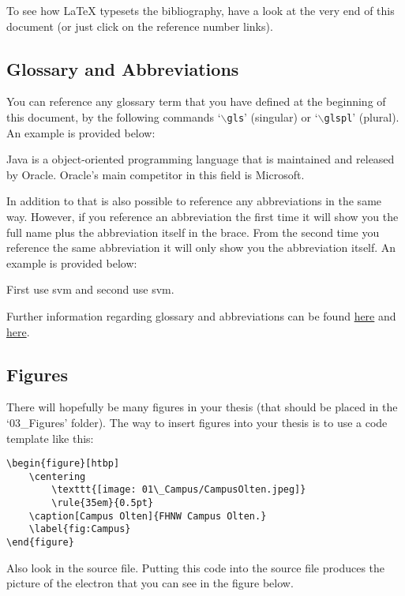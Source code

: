 To see how \LaTeX{} typesets the bibliography, have a look at the very end of this document (or just click on the reference number links).

\subsection{Glossary and Abbreviations}

You can reference any glossary term that you have defined at the beginning of this document, by the following commands `$\backslash$\texttt{gls}' (singular) or `$\backslash$\texttt{glspl}' (plural). An example is provided below:

\gls{Java} is a object-oriented programming language that is maintained and released by \gls{Oracle}. \gls{Oracle}'s main competitor in this field is \gls{Microsoft}.

In addition to that is also possible to reference any abbreviations in the same way. However, if you reference an abbreviation the first time it will show you the full name plus the abbreviation itself in the brace. From the second time you reference the same abbreviation it will only show you the abbreviation itself. An example is provided below:

First use \gls{svm} and second use \gls{svm}.

Further information regarding glossary and abbreviations can be found \href{http://www.ctan.org/pkg/glossaries}{here} and \href{http://latex-community.org/know-how/latex/55-latex-general/263-glossaries-nomenclature-lists-of-symbols-and-acronyms}{here}.

\subsection{Figures}

There will hopefully be many figures in your thesis (that should be placed in the `03\_Figures' folder). The way to insert figures into your thesis is to use a code template like this:

\begin{verbatim}
\begin{figure}[htbp]
	\centering
		\texttt{[image: 01\_Campus/CampusOlten.jpeg]}
		\rule{35em}{0.5pt}
	\caption[Campus Olten]{FHNW Campus Olten.}
	\label{fig:Campus}
\end{figure}
\end{verbatim}

Also look in the source file. Putting this code into the source file produces the picture of the electron that you can see in the figure below.

